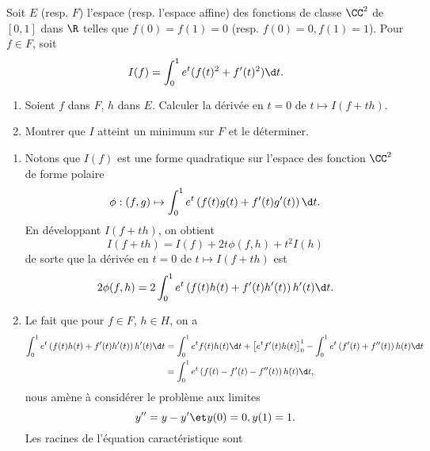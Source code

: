 \begin{enonce}
\begin{exercise}[ID={RMS120 E225, X-MP 2009},subtitle={},tags={}, difficulty={0}]
Soit $E$ (resp. $F$) l'espace (resp. l'espace affine) des fonctions de classe $\CC^2$ de $[0,1]$ dans $\R$ telles que $f(0)=f(1)=0$ (resp. $f(0)=0, f(1)=1$).
Pour $f\in F$, soit
\begin{equation*}
I(f) = \int_0^1 e^t(f(t)^2+f'(t)^2)\d t.
\end{equation*}
\begin{enumerate}
\item Soient $f$ dans $F$, $h$ dans $E$. Calculer la dérivée en $t=0$ de $t\mapsto I(f+th)$.
\item Montrer que $I$ atteint un minimum sur $F$ et le déterminer.
\end{enumerate}
\end{exercise}
\begin{solution}
\begin{enumerate}
\item  Notons que $I(f)$ est une forme quadratique sur l'espace des fonction $\CC^2$ de forme polaire
\begin{equation*}
\phi : (f,g)\mapsto \int_0^1 e^t \left(f(t)g(t)+f'(t)g'(t)\right) \d t.
\end{equation*}
En développant $I(f+th)$, on obtient
\begin{equation*}
    I(f+th)=I(f)+2t\phi(f,h)+t^2 I(h)
\end{equation*}
de sorte que la dérivée en $t=0$ de $t\mapsto I(f+th)$ est
\begin{equation*}
    2\phi(f,h)=2\int_0^1 e^t \left( f(t)h(t) + f'(t)h'(t) \right) h'(t)\d t.
\end{equation*}
\item Le fait que pour $f\in F$, $h\in H$, on a
\begin{align*}
\int_0^1 e^t \left(  f(t)h(t) + f'(t)h'(t) \right) h'(t)\d t
&= \int_0^1 e^t f(t)h(t)\d t + \left[ e^t f'(t)h(t)\right]_0^1 - \int_0^1 e^t\left( f'(t)+f''(t) \right) h(t)\d t\\
&= \int_0^1 e^t \left(f(t)-f'(t)-f''(t)\right) h(t) \d t,
\end{align*}
nous amène à considérer le problème aux limites
\begin{equation}
    y''=y-y' \et y(0)=0, y(1)=1.
\end{equation}
Les racines de l'équation caractéristique sont
\begin{equation*}

\end{equation*}
\end{enumerate}
\end{solution}
\end{enonce}
